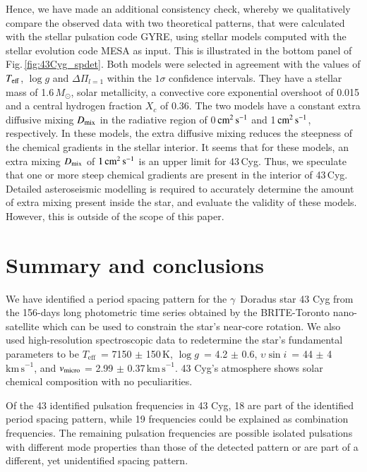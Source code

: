 \documentclass{aa}
\def\gdor{$\gamma$~Doradus }
\def\Teff{\ensuremath{T_{\mathrm{eff}}}}
\def\logg{\ensuremath{\log g}}
\def\vsini{\ensuremath{{\upsilon}\sin i}}
\def\kms{$\mathrm{km\,s}^{-1}$}
\begin{document}
Hence, we have made an additional consistency check, whereby we qualitatively compare the observed data with two theoretical patterns, that were calculated with the stellar pulsation code GYRE, using stellar models computed with the stellar evolution code MESA as input. This is illustrated in the bottom panel of Fig.\,\ref{fig:43Cyg_spdet}. Both models were selected in agreement with the values of $T_{\rm eff}$, $\logg$ and $\Delta \Pi_{l=1}$ within the $1\sigma$ confidence intervals. They have a stellar mass of 1.6\,$M_\odot$, 
solar metallicity, a convective core exponential overshoot of 0.015 and a central hydrogen fraction $X_c$ of 0.36. The two models have a constant extra diffusive mixing $D_{\rm mix}$ in the radiative region of 0\,$\rm cm^2\,s^{-1}$ and 1\,$\rm cm^2\,s^{-1}$, respectively. In these models, the extra diffusive mixing reduces the steepness of the chemical gradients in the stellar interior. It seems that for these models, an extra mixing $D_{\rm mix}$ of $1\,\rm cm^2\,s^{-1}$ is an upper limit for 43\,Cyg. Thus, we speculate that one or more steep chemical gradients are present in the interior of 43\,Cyg. Detailed asteroseismic modelling is required to accurately determine the amount of extra mixing present inside the star, and evaluate the validity of these models.  However, this is outside of the scope of this paper.




\section{Summary and conclusions}

We have identified a period spacing pattern for the \gdor star 43 Cyg from the 156-days long photometric time series obtained by the BRITE-Toronto nano-satellite which can be used to constrain the star's near-core rotation. We also used high-resolution spectroscopic data to redetermine the star's fundamental parameters to be \Teff\ = 7150 $\pm$ 150\,K, \logg\ = 4.2 $\pm$ 0.6, \vsini\ = 44 $\pm$ 4\,\kms, and $v_{\rm micro}$ = 2.99 $\pm$ 0.37\,\kms. 43 Cyg's atmosphere shows solar chemical composition with no peculiarities.

Of the 43 identified pulsation frequencies in 43 Cyg, 18 are part of the identified period spacing pattern, while 19 frequencies could be explained as combination frequencies. The remaining pulsation frequencies are possible isolated pulsations with different mode properties than those of the detected pattern or are part of a different, yet unidentified spacing pattern.
\end{document}
